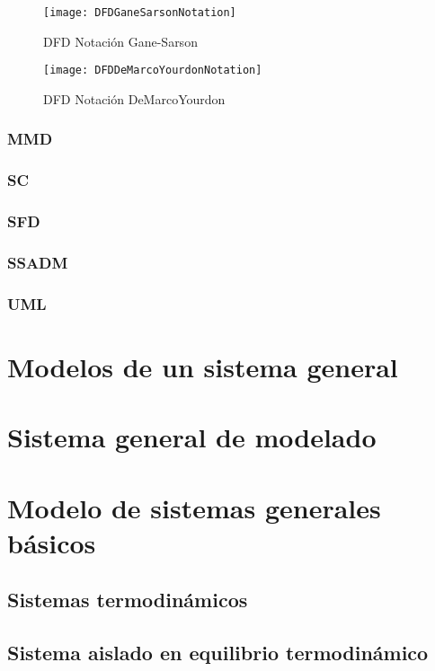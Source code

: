 \begin{figure}[h]
  \texttt{[image: DFDGaneSarsonNotation]}
  \caption{DFD Notación Gane-Sarson}
  \centering
  \label{fig:DFDGaneSarsonNotation} %
\end{figure}

\begin{figure}[h]
  \texttt{[image: DFDDeMarcoYourdonNotation]}
  \caption{DFD Notación DeMarcoYourdon}
  \centering
  \label{fig:DFDDeMarcoYourdonNotation} %
\end{figure}


\subsubsection{MMD}
\subsubsection{SC}
\subsubsection{SFD}
\subsubsection{SSADM}
\subsubsection{UML}

\section{Modelos de un sistema general}
\section{Sistema general de modelado}
\section{Modelo de sistemas generales básicos}
\subsection{Sistemas termodinámicos}
\subsection{Sistema aislado en equilibrio termodinámico}
